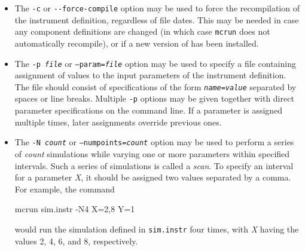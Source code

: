 \begin{itemize}
\item The \verb+-c+ or \verb+--force-compile+ option may be used to force the
  recompilation of the instrument definition, regardless of file dates. This may
  be needed in case any component definitions are changed (in which case
  \verb+mcrun+ does not automatically recompile), or if a new version of \MCS
  has been installed.
\item The \texttt{-p \textit{file}} or \texttt{--param=\textit{file}} option may be
  used to specify a file containing assignment of values to the input parameters
  of the instrument definition. The file should consist of specifications of the
  form \texttt{\textit{name\/}=\textit{value\/}} separated by spaces or line
  breaks. Multiple \verb+-p+ options may be given together with direct parameter
  specifications on the command line. If a parameter is assigned multiple times,
  later assignments override previous ones.
\item The \texttt{-N \textit{count}} or \texttt{--numpoints=\textit{count}} option
  may be used to perform a series of \textit{count\/} simulations while
  varying one or more parameters within specified intervals. Such a
  series of simulations is called a \emph{scan}. To specify
  an interval for a parameter \textit{X}, it should be assigned two
  values separated by a comma. For example, the command
\begin{bash}
mcrun sim.instr -N4 X=2,8 Y=1
\end{bash}
would run the simulation defined in \verb+sim.instr+ four times, with
\textit{X} having the values 2, 4, 6, and 8, respectively.


\end{itemize}
